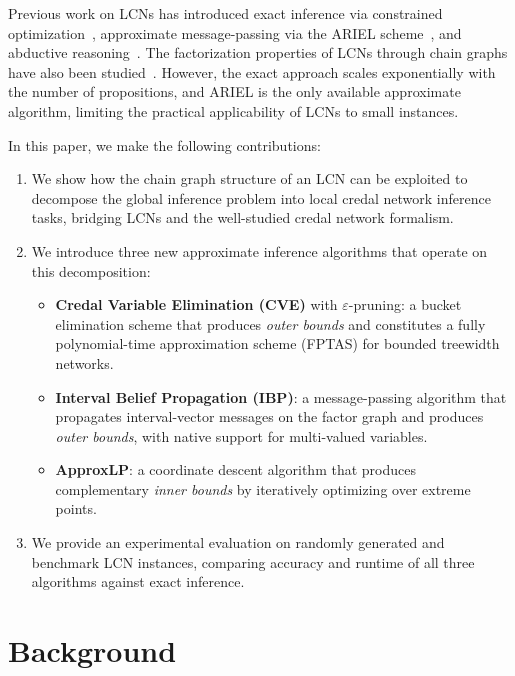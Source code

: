 \documentclass{article}
\begin{document}
Previous work on LCNs has introduced exact inference via constrained optimization~\cite{marinescu2022neurips}, approximate message-passing via the ARIEL scheme~\cite{marinescu2023lcn}, and abductive reasoning~\cite{marinescu2024neurips}. The factorization properties of LCNs through chain graphs have also been studied~\cite{cozman2024ijar}. However, the exact approach scales exponentially with the number of propositions, and ARIEL is the only available approximate algorithm, limiting the practical applicability of LCNs to small instances.

In this paper, we make the following contributions:
\begin{enumerate}
    \item We show how the chain graph structure of an LCN can be exploited to decompose the global inference problem into local credal network inference tasks, bridging LCNs and the well-studied credal network formalism.
    \item We introduce three new approximate inference algorithms that operate on this decomposition:
    \begin{itemize}
        \item \textbf{Credal Variable Elimination (CVE)} with $\varepsilon$-pruning: a bucket elimination scheme that produces \emph{outer bounds} and constitutes a fully polynomial-time approximation scheme (FPTAS) for bounded treewidth networks.
        \item \textbf{Interval Belief Propagation (IBP)}: a message-passing algorithm that propagates interval-vector messages on the factor graph and produces \emph{outer bounds}, with native support for multi-valued variables.
        \item \textbf{ApproxLP}: a coordinate descent algorithm that produces complementary \emph{inner bounds} by iteratively optimizing over extreme points.
    \end{itemize}
    \item We provide an experimental evaluation on randomly generated and benchmark LCN instances, comparing accuracy and runtime of all three algorithms against exact inference.
\end{enumerate}


\section{Background}
\label{sec-background}
\end{document}
